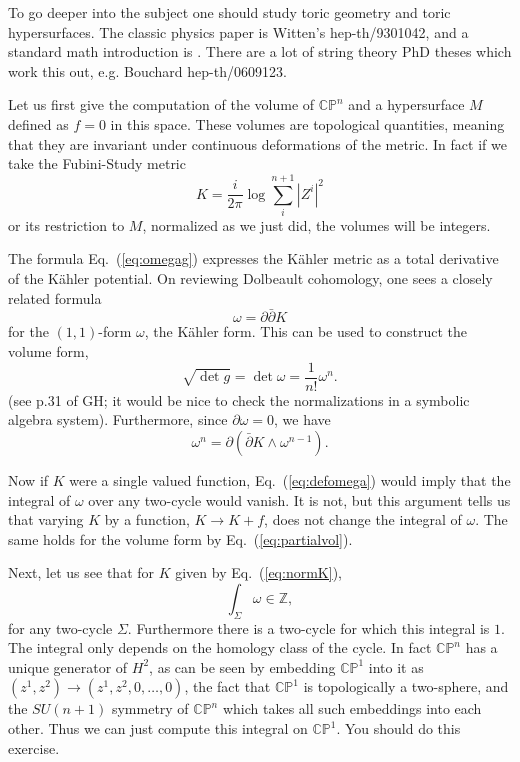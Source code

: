 \documentclass[12pt]{article}
\def\IC{\mathbb{C}}
\def\IZ{\mathbb{Z}}
\def\IP{\mathbb{P}}
\newcommand{\eq}[1]{Eq.~(\ref{eq:#1})}
\newcommand{\be}{\begin{equation}}
\newcommand{\ee}{\end{equation}}
\def\bpartial{\bar{\partial}}
\begin{document}
To go deeper into the subject one should study toric geometry and toric hypersurfaces.
The classic physics paper is Witten's hep-th/9301042, and a standard math introduction is \cite{Fulton}.
There are a lot of string theory PhD theses which work this out, e.g. Bouchard  hep-th/0609123.

Let us first give the computation of the volume of $\IC\IP^n$ and a hypersurface $M$ defined as $f=0$ in this space.
These volumes are topological quantities, meaning that they are invariant under continuous deformations
of the metric.  In fact if we take the Fubini-Study metric 
\be \label{eq:normK}
K=\frac{i}{2\pi}\log \sum_i^{n+1} |Z^i|^2
\ee
or its restriction to $M$, normalized as we just did, the volumes will be integers.

The formula \eq{omegag} expresses the K\"ahler metric as a total derivative of the K\"ahler potential.
On reviewing Dolbeault cohomology, one sees a closely related formula
\be \label{eq:defomega}
\omega = \partial\bpartial K
\ee
for the $(1,1)$-form $\omega$, the K\"ahler form.  This can be used to construct the volume form,
\be
\sqrt{\det g} = \det\omega = \frac{1}{n!}\omega^n .
\ee
(see p.31 of GH; it would be nice to check the normalizations in a symbolic algebra system).
Furthermore, since $\partial\omega=0$, we have
\be \label{eq:partialvol}
\omega^n = \partial (\bpartial K\wedge \omega^{n-1}).
\ee

Now if $K$ were a single valued function, \eq{defomega} would imply that
the integral of $\omega$ over any two-cycle would vanish.  It is not, but this argument tells us that varying $K$ by
a function, $K\rightarrow K+f$, does not change the integral of $\omega$.  The same holds for the volume form
by \eq{partialvol}.

Next, let us see that for $K$ given by \eq{normK},
\be\label{eq:dirac}
\int_{\Sigma} \omega \in \IZ,
\ee
for any two-cycle $\Sigma$.  Furthermore there is a two-cycle for which this integral is $1$.
The integral only depends on the homology class of the cycle. 
In fact $\IC\IP^n$ has a unique generator of $H^2$, as
can be seen by embedding $\IC\IP^1$ into it as $(z^1,z^2)\rightarrow(z^1,z^2,0,\ldots,0)$, the fact
that $\IC\IP^1$ is topologically a two-sphere, and the $SU(n+1)$ symmetry of $\IC\IP^n$ which takes
all such embeddings into each other.  Thus we can just compute this integral on $\IC\IP^1$.
You should do this exercise.
\end{document}
